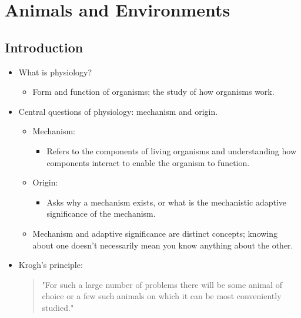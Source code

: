 \documentclass[12pt,a4paper]{article}
\begin{document}
\tableofcontents
\cleardoublepage
\fancyhead{}

\clearpage
\section{Animals and Environments}
\subsection{Introduction}
\begin{itemize}
    \item What is physiology?
        \begin{itemize}
            \item Form and function of organisms; the study of how organisms work.
        \end{itemize}
    \item Central questions of physiology: {\color{o-Sun}mechanism} and {\color{o-Sun}origin}.
        \begin{itemize}
            \item Mechanism:
                \begin{itemize}
                    \item Refers to the {\color{o-Sun}components} of living organisms and understanding {\color{o-Sun}how} components interact to enable the organism to function.
                \end{itemize}
            \item Origin:
                \begin{itemize}
                    \item Asks why a mechanism exists, or {\color{o-Sun}what} is the mechanistic {\color{o-Sun}adaptive significance} of the mechanism.
                \end{itemize}
            \item Mechanism and adaptive significance are distinct concepts; knowing about one doesn't necessarily mean you know anything about the other.
        \end{itemize}
    \item Krogh's principle: \begin{quote}\color{G-Moon}
        "For such a large number of problems there will be some animal of choice or a few such animals on which it can be most conveniently studied."\end{quote}

\end{itemize}
\end{document}
